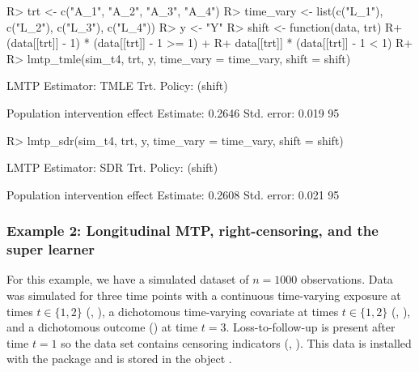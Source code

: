 \documentclass[]{jss}
\begin{document}
\begin{CodeChunk}

\begin{CodeInput}
R> trt <- c("A_1", "A_2", "A_3", "A_4")
R> time_vary <- list(c("L_1"), c("L_2"), c("L_3"), c("L_4"))
R> y <- "Y"
R> shift <- function(data, trt) {
R+   (data[[trt]] - 1) * (data[[trt]] - 1 >= 1) + 
R+     data[[trt]] * (data[[trt]] - 1 < 1)
R+ }
R> lmtp_tmle(sim_t4, trt, y, time_vary = time_vary, shift = shift)
\end{CodeInput}

\begin{CodeOutput}
LMTP Estimator: TMLE
   Trt. Policy: (shift)

Population intervention effect
      Estimate: 0.2646
    Std. error: 0.019
        95%
\end{CodeOutput}

\begin{CodeInput}
R> lmtp_sdr(sim_t4, trt, y, time_vary = time_vary, shift = shift)
\end{CodeInput}

\begin{CodeOutput}
LMTP Estimator: SDR
   Trt. Policy: (shift)

Population intervention effect
      Estimate: 0.2608
    Std. error: 0.021
        95%
\end{CodeOutput}

\end{CodeChunk}

\hypertarget{example-2-longitudinal-mtp-right-censoring-and-the-super-learner}{%
\subsubsection{Example 2: Longitudinal MTP, right-censoring, and the
super
learner}\label{example-2-longitudinal-mtp-right-censoring-and-the-super-learner}}

For this
example, we have a simulated dataset of \(n = 1000\) observations. Data
was simulated for three time points with a continuous time-varying
exposure at times \(t \in \{1, 2\}\) (, ), a
dichotomous time-varying covariate at times \(t \in \{1, 2\}\)
(, ), and a dichotomous outcome () at time
\(t = 3\). Loss-to-follow-up is present after time \(t = 1\) so the data set
contains censoring indicators (, ). This data is
installed with the package and is stored in the object .
\end{document}
